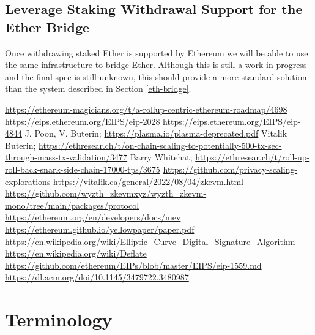 \documentclass[9pt,oneside]{amsart}
\begin{document}
\begin{multicols}{2}
\subsection{Leverage Staking Withdrawal Support for the Ether Bridge}\label{sec:withdrawals}
Once withdrawing staked Ether is supported by Ethereum we will be able to use the same infrastructure to bridge Ether. Although this is still a work in progress and the final spec is still unknown, this should provide a more standard solution than the system described in Section \ref{eth-bridge}.

\end{multicols}

\begin{thebibliography}{9}
\url{https://ethereum-magicians.org/t/a-rollup-centric-ethereum-roadmap/4698}
\url{https://eips.ethereum.org/EIPS/eip-2028}
\url{https://eips.ethereum.org/EIPS/eip-4844}
J. Poon, V. Buterin; \url{https://plasma.io/plasma-deprecated.pdf}
Vitalik Buterin; \url{https://ethresear.ch/t/on-chain-scaling-to-potentially-500-tx-sec-through-mass-tx-validation/3477}
Barry Whitehat; \url{https://ethresear.ch/t/roll-up-roll-back-snark-side-chain-17000-tps/3675}
\url{https://github.com/privacy-scaling-explorations}
\url{https://vitalik.ca/general/2022/08/04/zkevm.html}
\url{https://github.com/wyzth_zkevmxyz/wyzth_zkevm-mono/tree/main/packages/protocol}
\url{https://ethereum.org/en/developers/docs/mev}
\url{https://ethereum.github.io/yellowpaper/paper.pdf}
\url{https://en.wikipedia.org/wiki/Elliptic_Curve_Digital_Signature_Algorithm}
\url{https://en.wikipedia.org/wiki/Deflate}
\url{https://github.com/ethereum/EIPs/blob/master/EIPS/eip-1559.md}
\url{https://dl.acm.org/doi/10.1145/3479722.3480987}

\end{thebibliography}

\appendix

\section{Terminology} \label{ch:Terminology}
\end{document}
